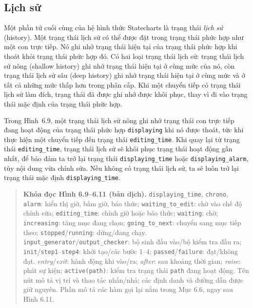 \subsection{Lịch sử}
Một phần tử cuối cùng của hệ hình thức Statecharts là trạng thái \emph{lịch sử} (history). Một trạng thái lịch sử có thể được đặt trong trạng thái phức hợp như một con trực tiếp. Nó ghi nhớ trạng thái hiện tại của trạng thái phức hợp khi thoát khỏi trạng thái phức hợp đó. Có hai loại trạng thái lịch sử: trạng thái lịch sử nông (shallow history) ghi nhớ trạng thái hiện tại ở cùng mức của nó, còn trạng thái lịch sử sâu (deep history) ghi nhớ trạng thái hiện tại ở cùng mức và ở tất cả những mức thấp hơn trong phân cấp. Khi một chuyển tiếp có trạng thái lịch sử làm đích, trạng thái đã được ghi nhớ được khôi phục, thay vì đi vào trạng thái mặc định của trạng thái phức hợp.

Trong Hình~6.9, một trạng thái lịch sử nông ghi nhớ trạng thái con trực tiếp đang hoạt động của trạng thái phức hợp \texttt{displaying} khi nó được thoát, tức khi thực hiện một chuyển tiếp đến trạng thái \texttt{editing\_time}. Khi quay lại từ trạng thái \texttt{editing\_time}, trạng thái lịch sử sẽ khôi phục trạng thái hoạt động gần nhất, để bảo đảm ta trở lại trạng thái \texttt{displaying\_time} hoặc \texttt{displaying\_alarm}, tùy nội dung vừa chỉnh sửa. Nếu không có trạng thái lịch sử, ta sẽ luôn trở lại trạng thái mặc định \texttt{displaying\_time}.

\begin{quote}\small
\textbf{Khóa đọc Hình 6.9--6.11 (bản dịch).} \texttt{displaying\_time}, \texttt{chrono}, \texttt{alarm}: hiển thị giờ, bấm giờ, báo thức; \texttt{waiting\_to\_edit}: chờ vào chế độ chỉnh sửa; \texttt{editing\_time}: chỉnh giờ hoặc báo thức; \texttt{waiting}: chờ; \texttt{increasing}: tăng mục đang chọn; \texttt{going\_to\_next}: chuyển sang mục tiếp theo; \texttt{stopped}/\texttt{running}: dừng/đang chạy. \texttt{input\_generator}/\texttt{output\_checker}: bộ sinh đầu vào/bộ kiểm tra đầu ra; \texttt{init}/\texttt{step1}--\texttt{step4}: khởi tạo/các bước 1--4; \texttt{passed}/\texttt{failure}: đạt/không đạt. \emph{entry}/\emph{exit}: hành động khi vào/ra; \emph{after}: sau khoảng thời gian; \emph{raise}: phát sự kiện; \texttt{active(path)}: kiểm tra trạng thái \texttt{path} đang hoạt động. Tên nút mô tả vị trí và thao tác nhấn/nhả; các định danh và đường dẫn được giữ nguyên. Phần mô tả các hàm gọi lại nằm trong Mục 6.6, ngay sau Hình 6.11.
\end{quote}

